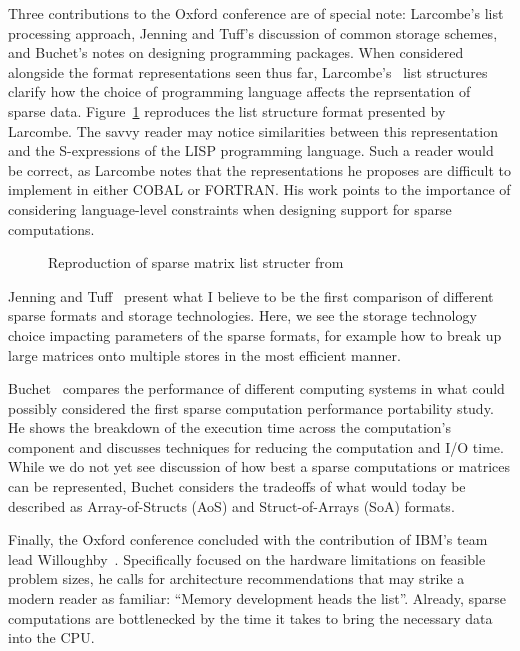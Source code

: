 Three contributions to the Oxford conference are of special note: Larcombe's list processing approach, Jenning and Tuff's discussion of common storage schemes, and Buchet's notes on designing programming packages.
When considered alongside the format representations seen thus far, Larcombe's~\cite{larcombe1971list} list structures clarify how the choice of programming language affects the reprsentation of sparse data.
Figure~\ref{listStructure} reproduces the list structure format presented by Larcombe. 
The savvy reader may notice similarities between this representation and the S-expressions of the LISP programming language.
Such a reader would be correct, as Larcombe notes that the representations he proposes are difficult to implement in either COBAL or FORTRAN. 
His work points to the importance of considering language-level constraints when designing support for sparse computations.
\begin{figure}
  \caption{Reproduction of sparse matrix list structer from~\cite{larcombe1971list}}
\label{listStructure}
\end{figure}

Jenning and Tuff~\cite{jennings1971direct} present what I believe to be the first comparison of different sparse formats and storage technologies. 
Here, we see the storage technology choice impacting parameters of the sparse formats, for example how to break up large matrices onto multiple stores in the most efficient manner. 

Buchet~\cite{buchet1971take} compares the performance of different computing systems in what could possibly considered the first sparse computation performance portability study. 
He shows the breakdown of the execution time across the computation's component and discusses techniques for reducing the computation and I/O time. 
While we do not yet see discussion of how best a sparse computations or matrices can be represented, Buchet considers the tradeoffs of what would today be described as Array-of-Structs (AoS) and Struct-of-Arrays (SoA) formats.

Finally, the Oxford conference concluded with the contribution of IBM's team lead Willoughby~\cite{willoughby1971sparse}. Specifically focused on the hardware limitations on feasible problem sizes, he calls for architecture recommendations that may strike a modern reader as familiar: \enquote{Memory development heads the list}. 
Already, sparse computations are bottlenecked by the time it takes to bring the necessary data into the CPU. 

